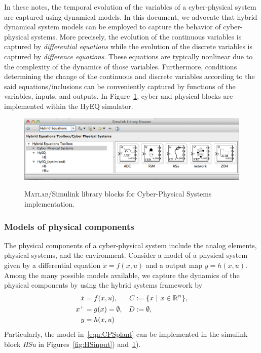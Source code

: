 \documentclass{article}
\newcommand{\matlab}{\textsc{Matlab}}
\begin{document}
In these notes, the temporal evolution of the variables of a cyber-physical system
are captured using dynamical models.
In this document, we advocate that hybrid dynamical system models
can be employed to capture the behavior of cyber-physical systems.
More precisely, the evolution of the continuous variables is captured by 
{\em differential equations}
while the evolution of the discrete variables is captured by
{\em difference equations}.
These equations are typically nonlinear
due to the complexity of the dynamics of those variables.
Furthermore, conditions determining the change of 
the continuous and discrete variables according to the said
equations/inclusions can be conveniently captured by functions of the
variables, inputs, and outputs.  
In Figure~\ref{fig:CPS}, cyber and physical blocks are implemented within the HyEQ simulator.

\begin{figure}[ht]
  \begin{center}
    {\includegraphics[width=1.0\textwidth]{figures/Simulink/SimulinkimplementationCPS_Mac.eps}}
\caption{\matlab{}/Simulink library blocks for Cyber-Physical Systems implementation.}
\label{fig:CPS}
  \end{center}
\end{figure}

\subsubsection{Models of physical components}
\label{sec:PhysicalModels}

The physical components of a cyber-physical system include the analog elements, 
physical systems, and the environment. 
Consider a model of a physical system given by a differential equation $\dot{x} = f(x,u)$ 
and a output map $y = h(x,u)$. Among the many possible models available, 
we capture the dynamics of the physical components
by using the hybrid systems framework by
\begin{subequations}\label{eqn:CPSplant}
\begin{align}
\dot{x} &= f(x,u), 
&C &:= \{ x\ |\ x \in {\mathbb R}^{n}\},\\
x^+ &= g(x) =\emptyset,
&D &:= \emptyset,\\
y &= h(x,u)
\end{align}
\end{subequations}
Particularly, the model in~\eqref{eqn:CPSplant} can be implemented 
in the simulink block {\em HSu} in Figures~\ref{fig:HSinput}) and~\ref{fig:CPS}).
\end{document}
